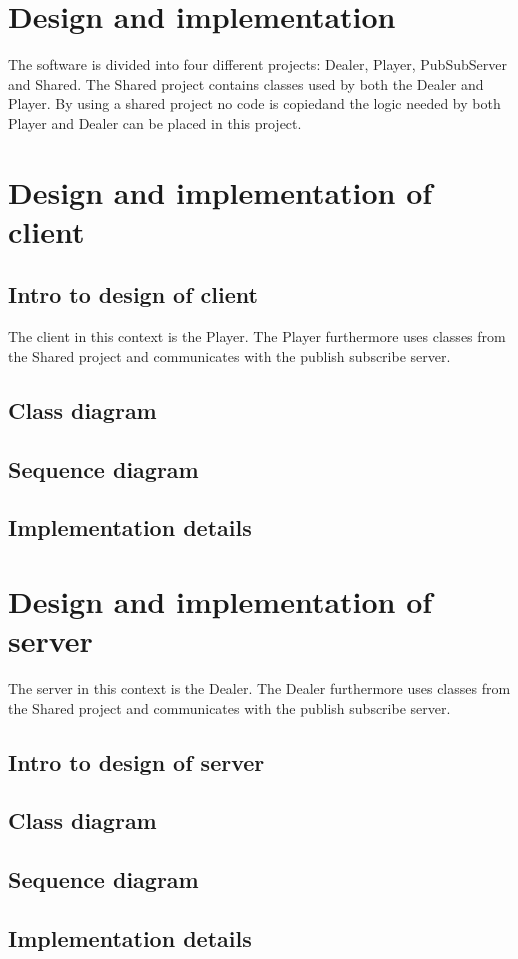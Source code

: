 
\section{Design and implementation}
The software is divided into four different projects: Dealer, Player, PubSubServer and Shared. The Shared project contains classes used by both the Dealer and Player. By using a shared project no code is copiedand the logic needed by both Player and Dealer can be placed in this project.

\section{Design and implementation of client}

\subsection{Intro to design of client}
The client in this context is the Player. The Player furthermore uses classes from the Shared project and communicates with the publish subscribe server.

\subsection{Class diagram}

\subsection{Sequence diagram}

\subsection{Implementation details}


\section{Design and implementation of server}
The server in this context is the Dealer. The Dealer furthermore uses classes from the Shared project and communicates with the publish subscribe server.

\subsection{Intro to design of server}

\subsection{Class diagram}

\subsection{Sequence diagram}

\subsection{Implementation details}